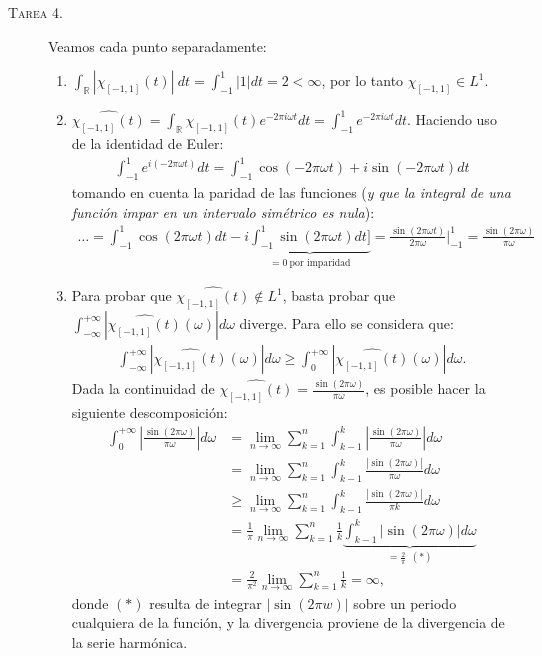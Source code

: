 \documentclass[spanish, fleqn]{article}
\begin{document}
\begin{description}
    \item[\textsc{Tarea 4.}] Veamos cada punto separadamente:
    \begin{enumerate}
        \item $\displaystyle \int_{\mathbb{R}} |\chi_{[-1,1]}(t)|\ dt = \int_{-1}^{1} |1| dt = 2 < \infty$, por lo tanto $\chi_{[-1,1]} \in L^1$.
        \item $\displaystyle \widehat{\chi_{[-1,1]}(t)} = \int_{\mathbb{R}} \chi_{[-1,1]}(t) e^{-2 \pi i \omega t} dt = \int_{-1}^{1} e^{-2 \pi i \omega t} dt$. Haciendo uso de la identidad de Euler:
        \begin{align*}
            \int_{-1}^{1} e^{i (-2 \pi \omega t)} dt = \int_{-1}^{1} \cos(-2 \pi \omega t) + i \sin(-2 \pi \omega t) dt
        \end{align*}
        tomando en cuenta la paridad de las funciones (\textit{y que la integral de una función impar en un intervalo simétrico es nula}):
        \begin{align*}
            \ldots = \int_{-1}^{1} \cos(2 \pi \omega t) dt - i \underbrace{\int_{-1}^{1} \sin(2 \pi \omega t) dt]}_{= 0 \ \text{por imparidad}} = \frac{\sin(2 \pi \omega t)}{2 \pi \omega} \bigg|_{-1}^{1} = \frac{\sin(2 \pi \omega)}{\pi \omega}
        \end{align*}
        \item Para probar que $\displaystyle \widehat{\chi_{[-1,1]}(t)} \notin L^1$, basta probar que $ \displaystyle \int_{-\infty}^{+\infty} \left|\widehat{\chi_{[-1,1]}(t)}(\omega)\right| d\omega$ diverge. Para ello se considera que:
        \begin{align*}
            \int_{-\infty}^{+\infty} \left|\widehat{\chi_{[-1,1]}(t)}(\omega)\right| d\omega \geq \int_{0}^{+\infty} \left|\widehat{\chi_{[-1,1]}(t)}(\omega)\right| d\omega.
        \end{align*}
        Dada la continuidad de $\displaystyle \widehat{\chi_{[-1,1]}(t)} = \frac{\sin(2 \pi \omega)}{\pi \omega}$, es posible hacer la siguiente descomposición:
        \begin{align*}
            \int_{0}^{+\infty} \left| \frac{\sin(2 \pi \omega)}{\pi \omega} \right| d\omega &= \lim_{n\rightarrow \infty} \sum_{k=1}^{n} \int_{k-1}^{k} \left|\frac{\sin(2 \pi \omega)}{\pi \omega}\right| d\omega \\
            &= \lim_{n\rightarrow \infty} \sum_{k=1}^{n} \int_{k-1}^{k} \frac{\left| \sin(2 \pi \omega) \right|}{\pi \omega} d\omega \\
            &\geq \lim_{n\rightarrow \infty} \sum_{k=1}^{n} \int_{k-1}^{k} \frac{\left| \sin(2 \pi \omega) \right|}{\pi k} d\omega \\
            &=  \frac{1}{\pi} \lim_{n\rightarrow \infty} \sum_{k=1}^{n} \frac{1}{k} \underbrace{\int_{k-1}^{k} \left| \sin(2 \pi \omega) \right| d\omega}_{= \frac{2}{\pi} \ \ (*)} \\
            &= \frac{2}{\pi^2} \lim_{n\rightarrow \infty} \sum_{k=1}^{n} \frac{1}{k} = \infty,
        \end{align*}
        donde $(*)$ resulta de integrar $|\sin(2 \pi w)|$ sobre un periodo cualquiera de la función, y la divergencia proviene de la divergencia de la serie harmónica.



\end{enumerate}
\end{description}
\end{document}
